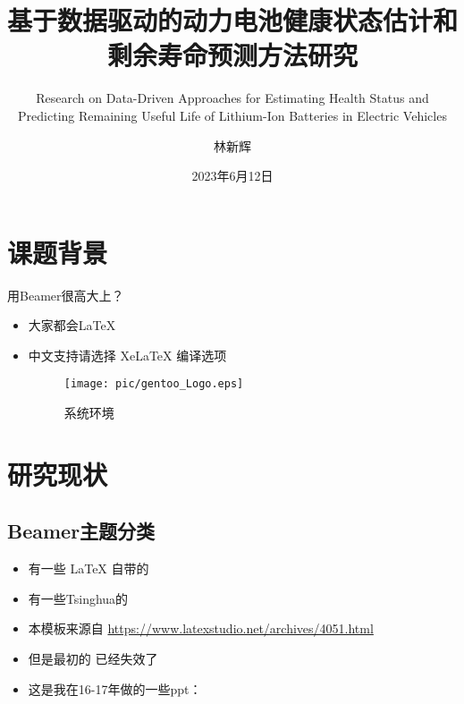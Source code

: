 \documentclass{beamer}
\author{林新辉}
\title{基于数据驱动的动力电池健康状态估计和剩余寿命预测方法研究}
\subtitle{Research on Data-Driven Approaches for Estimating Health Status and Predicting Remaining Useful Life of Lithium-Ion Batteries in Electric Vehicles}
\institute{控制与计算机工程学院，华北电力大学}
\date{2023年6月12日}
\begin{document}
\kaishu
\begin{frame}
	\titlepage
\end{frame}
\begin{frame}
\tableofcontents[sectionstyle=show,subsectionstyle=show/shaded/hide,subsubsectionstyle=show/shaded/hide]
\end{frame}


\section{课题背景}

\begin{frame}{用Beamer很高大上？}
\begin{itemize}
\item 大家都会\LaTeX{}
\item 中文支持请选择 Xe\LaTeX{} 编译选项
    \begin{figure}
        \centering
        \texttt{[image: pic/gentoo\_Logo.eps]}
        \caption{系统环境}
    \end{figure}
\end{itemize}
\end{frame}

\section{研究现状}

\subsection{Beamer主题分类}

\begin{frame}
\begin{itemize}
\item 有一些 \LaTeX{} 自带的
\item 有一些Tsinghua的
\item 本模板来源自 \newline \url{https://www.latexstudio.net/archives/4051.html}
\item 但是最初的 \href{http://far.tooold.cn/post/latex/beamertsinghua}{\color{purple}{link}} \cite{origin}已经失效了
\item 这是我在16-17年做的一些ppt：\href{https://github.com/Trinkle23897/oi_slides}{\color{purple}{戳我}}
\end{itemize}
\end{frame}
\end{document}
